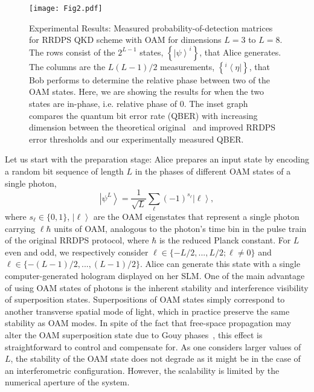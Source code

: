 \documentclass[twocolumn,aps,prl,floatfix,superscriptaddress]{revtex4-1}
\newcommand{\bra}[1]{\left\langle #1 \right|}
\newcommand{\ket}[1]{\left| #1 \right\rangle}
\begin{document}
\begin{figure*}[!htbp]
	\begin{center}
	\texttt{[image: Fig2.pdf]}
	\caption[]{Experimental Results: Measured probability-of-detection matrices for RRDPS QKD scheme with OAM for dimensions $L=3$ to $L=8$. The rows consist of the $2^{L-1}$ states, $\left\{ \ket{\psi}^i \right\}$, that Alice generates. The columns are the $L(L-1)/2$ measurements, $\left\{ ^i \bra{\eta} \right\}$, that Bob performs to determine the relative phase between two of the OAM states. Here, we are showing the results for when the two states are in-phase, i.e. relative phase of 0. The inset graph compares the quantum bit error rate (QBER) with increasing dimension between the theoretical original~\cite{sasaki:14} and improved RRDPS~\cite{Yin:18} error thresholds and our experimentally measured QBER.}%
	\label{fig:fig2}
	\end{center}
\end{figure*}

Let us start with the preparation stage: Alice prepares an input state by encoding a random bit sequence of length $L$ in the phases of different OAM states of a single photon,
	\begin{equation}\label{input_state}
		\ket{\psi^L} = \frac{1}{\sqrt{L}}\sum_{\ell}(-1)^{s_{\ell}}\ket{\ell},
	\end{equation}
where $s_{\ell} \in \{ 0,1 \}$, $\ket{\ell}$ are the OAM eigenstates that represent a single photon carrying $\ell\hbar$ units of OAM, analogous to the photon's time bin in the pulse train of the original RRDPS protocol, where $\hbar$ is the reduced Planck constant. For $L$ even and odd, we respectively consider \mbox{$\ell \in \{-L/2, ... , L/2 ; \ell \neq 0 \}$} and \mbox{$\ell \in \{ -(L-1)/2, ...,  (L-1)/2 \}$}. Alice can generate this state with a single computer-generated hologram displayed on her SLM. One of the main advantage of using OAM states of photons is the inherent stability and interference visibility of superposition states. Superpositions of OAM states simply correspond to another transverse spatial mode of light, which in practice preserve the same stability as OAM modes. In spite of the fact that free-space propagation may alter the OAM superposition state due to Gouy phases~\cite{born:13}, this effect is straightforward to control and compensate for. As one considers larger values of $L$, the stability of the OAM state does not degrade as it might be in the case of an interferometric configuration. However, the scalability is limited by the numerical aperture of the system.
\end{document}
